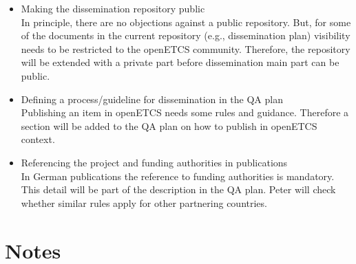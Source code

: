 \documentclass[a4paper, 11pt]{article}
\begin{document}
\begin{itemize}

\item Making the dissemination repository public \\
In principle, there are no objections against a public repository. But, for some of the documents  in the current repository (e.g., dissemination plan) visibility needs to be restricted to the openETCS community. Therefore, the repository will be extended with a private part before dissemination main part can be  public.\\

\item Defining a process/guideline for dissemination in the QA plan\\
Publishing an item in openETCS needs some rules and guidance. Therefore a section will be added to the QA plan on how to publish in openETCS context.

\item Referencing the project and funding authorities in publications\\ 
In German publications the reference to funding authorities is mandatory. This detail will be part of the description in the QA plan. Peter will check whether similar rules apply for other partnering countries.

\end{itemize}

\section{Notes}
\end{document}
